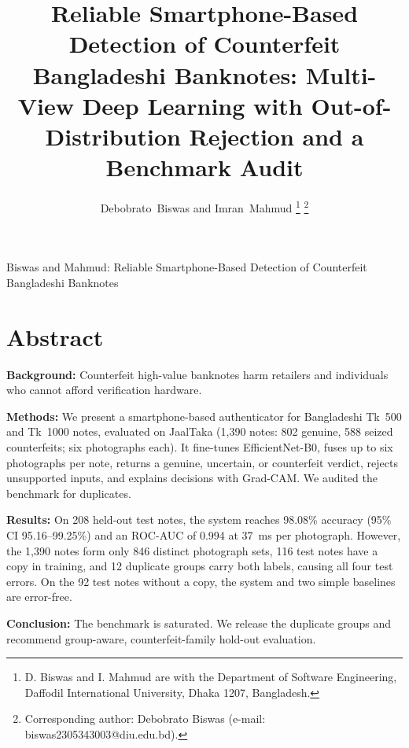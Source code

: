 \documentclass[journal]{IEEEtran}
\begin{document}
\title{Reliable Smartphone-Based Detection of Counterfeit Bangladeshi Banknotes:
Multi-View Deep Learning with Out-of-Distribution Rejection and a Benchmark Audit}

\author{Debobrato~Biswas and Imran~Mahmud%
\thanks{D. Biswas and I. Mahmud are with the Department of Software Engineering,
Daffodil International University, Dhaka 1207, Bangladesh.}%
\thanks{Corresponding author: Debobrato Biswas (e-mail: biswas2305343003@diu.edu.bd).}}

%
{Biswas and Mahmud: Reliable Smartphone-Based Detection of Counterfeit Bangladeshi Banknotes}

\maketitle

\section*{Abstract}
\noindent\textbf{Background:} Counterfeit high-value banknotes harm retailers and
individuals who cannot afford verification hardware.

\noindent\textbf{Methods:} We present a smartphone-based authenticator for Bangladeshi
Tk~500 and Tk~1000 notes, evaluated on JaalTaka (1{,}390 notes: 802 genuine, 588 seized
counterfeits; six photographs each). It fine-tunes EfficientNet-B0, fuses up to six
photographs per note, returns a genuine, uncertain, or counterfeit verdict, rejects
unsupported inputs, and explains decisions with Grad-CAM. We audited the benchmark for
duplicates.

\noindent\textbf{Results:} On 208 held-out test notes, the system reaches 98.08\%
accuracy (95\% CI 95.16--99.25\%) and an ROC-AUC of 0.994 at 37~ms per photograph.
However, the 1{,}390 notes form only 846 distinct photograph sets, 116 test notes have a
copy in training, and 12 duplicate groups carry both labels, causing all four test
errors. On the 92 test notes without a copy, the system and two simple baselines are
error-free.

\noindent\textbf{Conclusion:} The benchmark is saturated. We release the duplicate
groups and recommend group-aware, counterfeit-family hold-out evaluation.
\end{document}
